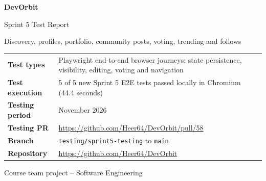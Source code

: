 \documentclass[11pt,a4paper]{article}
\begin{document}
\begin{titlepage}\centering\vspace*{2.3cm}
{\Huge\bfseries\color{accent} DevOrbit\par}\vspace{0.6cm}
{\LARGE Sprint 5 Test Report\par}\vspace{0.4cm}
{\Large Discovery, profiles, portfolio, community posts, voting, trending and follows\par}\vspace{1.5cm}
\begin{tabular}{>{\bfseries}l p{10cm}}
Test types & Playwright end-to-end browser journeys; state persistence, visibility, editing, voting and navigation \\
Test execution & 5 of 5 new Sprint 5 E2E tests passed locally in Chromium (44.4 seconds) \\
Testing period & November 2026 \\
Testing PR & \url{https://github.com/Heer64/DevOrbit/pull/58} \\
Branch & \texttt{testing/sprint5-testing} to \texttt{main} \\
Repository & \url{https://github.com/Heer64/DevOrbit} \\
\end{tabular}
\vfill{\small Course team project -- Software Engineering\par}
\end{titlepage}
\tableofcontents\newpage
\end{document}
